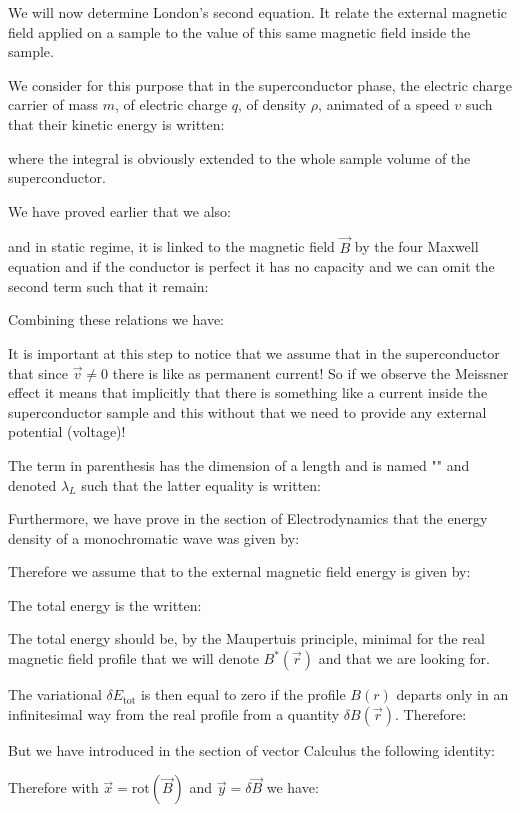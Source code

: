 	We will now determine London's second equation. It relate the external magnetic field applied on a sample to the value of this same magnetic field inside the sample.
	
	We consider for this purpose that in the superconductor phase, the electric charge carrier of mass $m$, of electric charge $q$, of density $\rho$, animated of a speed $v$ such that their kinetic energy is written:
	
	where the integral is obviously extended to the whole sample volume of the superconductor. 
	
	We have proved earlier that we also:
	
	and in static regime, it is linked to the magnetic field $\vec{B}$ by the four Maxwell equation and if the conductor is perfect it has no capacity and we can omit the second term such that it remain:
	
	Combining these relations we have:
	
	It is important at this step to notice that we assume that in the superconductor that since $\vec{v}\neq 0$ there is like as permanent current! So if we observe the Meissner effect it means that implicitly that there is something like a current inside the superconductor sample and this without that we need to provide any external potential (voltage)!
	
	The term in parenthesis has the dimension of a length and is named "" and denoted $\lambda_L$ such that the latter equality is written:
	
	Furthermore, we have prove in the section of Electrodynamics that the energy density of a monochromatic wave was given by:
	
	Therefore we assume that to the external magnetic field energy is given by:
	
	The total energy is the written:
	
	The total energy should be, by the Maupertuis principle, minimal for the real magnetic field profile that we will denote $B^{*}(\vec{r})$ and that we are looking for.
	
	The variational $\delta E_\text{tot}$ is then equal to zero if the profile $B(r)$ departs only in an infinitesimal way from the real profile from a quantity $\delta B(\vec{r})$. Therefore:
	
	But we have introduced in the section of vector Calculus the following identity:
	
	Therefore with $\vec{x}=\text{rot}(\vec{B})$ and $\vec{y}=\delta\vec{B}$ we have:
	

